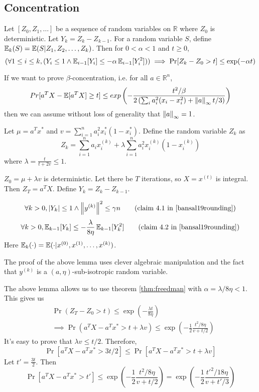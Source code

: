 \subsection{Concentration}

\begin{theorem}
\label{thm:freedman}
Let $[Z_0, Z_1, \ldots]$ be a sequence of random variables on $\mathbb{R}$
where $Z_0$ is deterministic. Let $Y_k = Z_k - Z_{k-1}$.
For a random variable $S$, define $\operatorname{\mathbb{E}}_k(S) = \operatorname{\mathbb{E}}(S | Z_1, Z_2, \ldots, Z_k)$.
Then for $0 < \alpha < 1$ and $t \ge 0$,
\[ (\forall 1 \le i \le k, (Y_i \le 1 \wedge \operatorname{\mathbb{E}}_{i-1}[Y_i] \le -\alpha\operatorname{\mathbb{E}}_{i-1}[Y_i^2]))
\implies \Pr[Z_k - Z_0 > t] \le \exp(-\alpha t) \]
\end{theorem}

\begin{lemma}
If we want to prove $\beta$-concentration, i.e. for all $a \in \mathbb{R}^n$,
\[ Pr[a^T X - \operatorname{\mathbb{E}}[a^T X] \ge t] \leq exp\left(-\frac{t^2/\beta}{
2\left(\sum_i a_i^2(x_i - x_i^2) + \left\lVert a \right\rVert_{\infty}t/3\right)}\right) \]
then we can assume without loss of generality that $\left\lVert a \right\rVert_{\infty} = 1$.
\end{lemma}

Let $\mu = a^Tx^*$ and $v = \sum_{i=1}^n a_i^2x_i^*(1-x_i^*)$.
Define the random variable $Z_k$ as
\[ Z_k = \sum_{i=1}^n a_ix^{(k)}_i + \lambda\sum_{i=1}^n a_i^2x^{(k)}_i(1-x^{(k)}_i) \]
where $\lambda = \frac{t}{t+2v} \le 1$.

$Z_0 = \mu + \lambda v$ is deterministic.
Let there be $T$ iterations, so $X = x^{(t)}$ is integral.
Then $Z_T = a^TX$. Define $Y_k = Z_k - Z_{k-1}$.

\begin{lemma}
\[ \forall k > 0, \abs{Y_k} \le 1 \wedge \norm{y^{(k)}}^2 \le \gamma n
\tag{claim 4.1 in \cite{bansal19rounding}} \]
\[ \forall k > 0, \E_{k-1}[Y_k] \le -\frac{\lambda}{8\eta} \E_{k-1}[Y_k^2]
\tag{claim 4.2 in \cite{bansal19rounding}} \]
Here $\operatorname{\mathbb{E}}_k(\cdot) = \operatorname{\mathbb{E}}(\cdot | x^{(0)}, x^{(1)}, \ldots, x^{(k)})$.
\end{lemma}
The proof of the above lemma uses clever algebraic manipulation
and the fact that $y^{(k)}$ is a $(a, \eta)$-sub-isotropic random variable.

The above lemma allows us to use theorem \ref{thm:freedman}
with $\alpha = \lambda/8\eta < 1$. This gives us
\begin{align*}
& \Pr(Z_T - Z_0 > t) \le \exp\left(-\frac{\lambda t}{8\eta} \right)
\\ &\implies \Pr(a^TX - a^Tx^* > t + \lambda v)
\le \exp\left(-\frac{1}{2} \frac{t^2/8\eta}{v + t/2} \right)
\end{align*}
It's easy to prove that $\lambda v \le t/2$. Therefore,
\[ \Pr[a^TX - a^Tx^* > 3t/2] \le \Pr[a^TX - a^Tx^* > t + \lambda v] \]
Let $t' = \frac{3t}{2}$. Then
\[ \Pr[a^TX - a^Tx^* > t']
\le \exp\left(-\frac{1}{2} \frac{t^2/8\eta}{v + t/2} \right)
= \exp\left(-\frac{1}{2} \frac{{t'}^2/18\eta}{v + t'/3} \right) \]

